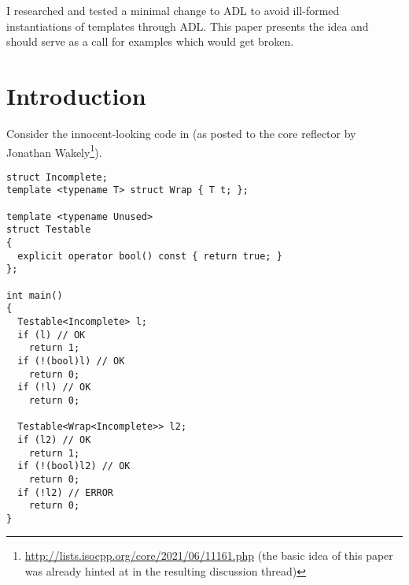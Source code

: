 \newcommand\wgTitle{A minimal ADL restriction to avoid ill-formed template instantiation}
\newcommand\wgName{Matthias Kretz <m.kretz@gsi.de>}
\newcommand\wgDocumentNumber{DMADLR0}
\newcommand\wgGroup{EWG}
\newcommand\wgTarget{\CC{}26}

\usepackage{mymacros}
\usepackage{wg21}
\usepackage{changelog}
\usepackage{underscore}



\newcommand\wglink[1]{\href{https://wg21.link/#1}{#1}}
\newcommand\notyetinstantiated{not\hyp{}yet\hyp{}instantiated\hyp{}templates\xspace}


\begin{wgTitlepage}
  I researched and tested a minimal change to ADL to avoid ill-formed instantiations of 
  templates through ADL. This paper presents the idea and should serve as a call for 
  examples which would get broken.
\end{wgTitlepage}

\pagestyle{scrheadings}

%

%

\section{Introduction}

Consider the innocent-looking code in  (as posted to the core reflector by 
Jonathan Wakely\footnote{\url{http://lists.isocpp.org/core/2021/06/11161.php} (the basic 
idea of this paper was already hinted at in the resulting discussion thread)}).
\begin{lstlisting}[style=Vc,float,label=lst:example1,caption={
Ill-formed instantiation of \type{Wrap<Incomplete>} because of ADL
}]
struct Incomplete;
template <typename T> struct Wrap { T t; };

template <typename Unused>
struct Testable
{
  explicit operator bool() const { return true; }
};

int main()
{
  Testable<Incomplete> l;
  if (l) // OK
    return 1;
  if (!(bool)l) // OK
    return 0;
  if (!l) // OK
    return 0;

  Testable<Wrap<Incomplete>> l2;
  if (l2) // OK
    return 1;
  if (!(bool)l2) // OK
    return 0;
  if (!l2) // ERROR
    return 0;
}
\end{lstlisting}

